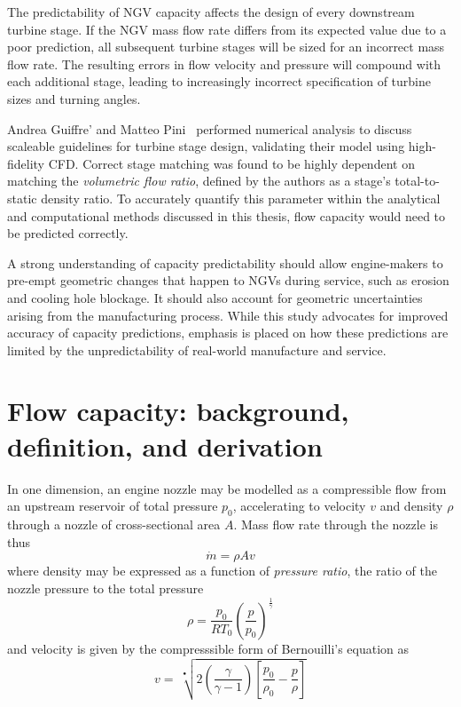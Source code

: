 \documentclass[a4paper, 11pt, twoside]{report}
\begin{document}
The predictability of NGV capacity affects the design of every downstream turbine stage. If the NGV mass flow rate differs from its expected value due to a poor prediction, all subsequent turbine stages will be sized for an incorrect mass flow rate. The resulting errors in flow velocity and pressure will compound with each additional stage, leading to increasingly incorrect specification of turbine sizes and turning angles.

Andrea Guiffre' and Matteo Pini~\cite{guiffre_design_guidelines} performed numerical analysis to discuss scaleable guidelines for turbine stage design, validating their model using high-fidelity CFD.  Correct stage matching was found to be highly dependent on matching the \textit{volumetric flow ratio}, defined by the authors as a stage's total-to-static density ratio. To accurately quantify this parameter within the analytical and computational methods discussed in this thesis, flow capacity would need to be predicted correctly.

A strong understanding of capacity predictability should allow engine-makers to pre-empt geometric changes that happen to NGVs during service, such as erosion and cooling hole blockage. It should also account for geometric uncertainties arising from the manufacturing process. While this study advocates for improved accuracy of capacity predictions, emphasis is placed on how these predictions are limited by the unpredictability of real-world manufacture and service.

\section{Flow capacity: background, definition, and derivation}
\label{flow_capacity_background_definition_and_derivation}

In one dimension, an engine nozzle may be modelled as a compressible flow from an upstream reservoir of total pressure $p_0$, accelerating to velocity $v$ and density $\rho$ through a nozzle of cross-sectional area $A$. Mass flow rate through the nozzle is thus
\begin{equation}
\dot{m} = \rho A v
\end{equation}
where density may be expressed as a function of \textit{pressure ratio}, the ratio of the nozzle pressure to the total pressure
\begin{equation}
\rho = \frac{p_0}{R T_0} \left(\frac{p}{p_0}\right)^\frac{1}{\gamma}
\end{equation}
and velocity is given by the compresssible form of Bernouilli's equation as
\begin{equation}
v = \>
\sqrt[•]{ 
	2 \left( \frac{\gamma}{\gamma - 1} \right) \left[ \frac{p_0}{\rho_0} - \frac{p}{\rho} \right] 
}
\end{equation}
\end{document}
